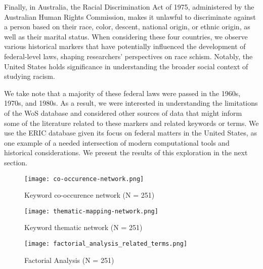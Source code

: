 Finally, in Australia, the Racial Discrimination Act of 1975, administered by the Australian Human Rights Commission, makes it unlawful to discriminate against a person based on their race, color, descent, national origin, or ethnic origin, as well as their marital status. When considering these four countries, we observe various historical markers that have potentially influenced the development of federal-level laws, shaping researchers' perspectives on race schism. Notably, the United States holds significance in understanding the broader social context of studying racism.

We take note that a majority of these federal laws were passed in the 1960s, 1970s, and 1980s. As a result, we were interested in understanding the limitations of the WoS database and considered other sources of data that might inform some of the literature related to these markers and related keywords or terms. We use the ERIC database given its focus on federal matters in the United States, as one example of a needed intersection of modern computational tools and historical considerations. We present the results of this exploration in the next section.




\begin{figure}[h]
\caption{Keyword co-occurence network (N = 251)}
\texttt{[image: co-occurence-network.png]}
\end{figure}

\begin{landscape}
\begin{centering}
\begin{figure}[h]
\caption{Keyword thematic network (N = 251)}
\texttt{[image: thematic-mapping-network.png]}
\end{figure}
\end{centering}
\end{landscape}


\begin{landscape}
\begin{centering}
\begin{figure}[h]
\caption{Factorial Analysis (N = 251)}
\texttt{[image: factorial\_analysis\_related\_terms.png]}
\end{figure}
\end{centering}
\end{landscape}


